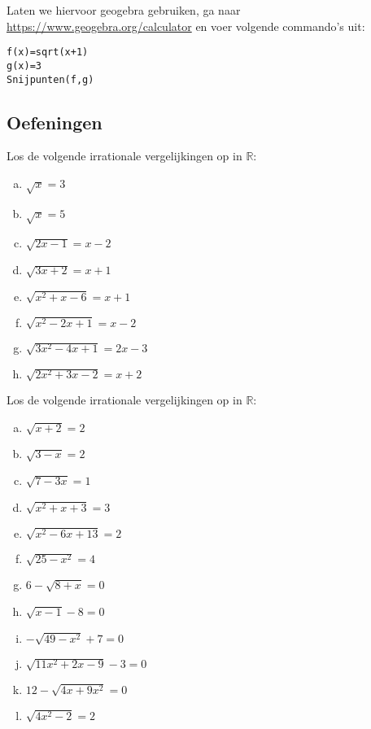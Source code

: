\documentclass[12pt,twoside]{article}
\begin{document}
Laten we hiervoor geogebra gebruiken, ga naar \url{https://www.geogebra.org/calculator} en voer volgende commando's uit:
\begin{verbatim}
f(x)=sqrt(x+1)
g(x)=3
Snijpunten(f,g)
\end{verbatim}

\needspace{3cm}
\subsection{Oefeningen}

\begin{oefening}
Los de volgende irrationale vergelijkingen op in \(\mathbb{R}\):
\begin{multicols}{2}
\begin{enumerate}[(a)]
\item \( \sqrt{x} = 3 \)
\item \( \sqrt{x} = 5 \)
\item \( \sqrt{2x - 1} = x - 2 \)
\item \( \sqrt{3x + 2} = x + 1 \)
\item \( \sqrt{x^2 + x - 6} = x + 1 \)
\item \( \sqrt{x^2 - 2x + 1} = x - 2 \)
\item \( \sqrt{3x^2 - 4x + 1} = 2x - 3 \)
\item \( \sqrt{2x^2 + 3x - 2} = x + 2 \)
\end{enumerate}
\end{multicols}
\end{oefening}



\begin{oefening}
Los de volgende irrationale vergelijkingen op in $\mathbb{R}$:
\begin{multicols}{2}
\begin{enumerate}[(a)]
  \item $\sqrt{x+2}=2$
  \item $\sqrt{3-x}=2$
  \item $\sqrt{7-3x}=1$
  \item $\sqrt{x^2+x+3}=3$
  \item $\sqrt{x^2-6x+13}=2$
  \item $\sqrt{25-x^2}=4$
  \item $6-\sqrt{8+x}=0$
  \item $\sqrt{x-1}-8=0$
  \item $-\sqrt{49-x^2}+7=0$
  \item $\sqrt{11x^2+2x-9}-3=0$
  \item $12-\sqrt{4x+9x^2}=0$
  \item $\sqrt{4x^2-2}=2$
\end{enumerate}
\end{multicols}
\end{oefening}
\end{document}
